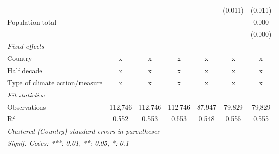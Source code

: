\begin{tabular}{lcccccc}
                                                                              &               &                &                &                & (0.011)        & (0.011)\\   
   Population total                                                           &               &                &                &                &                & 0.000\\   
                                                                              &               &                &                &                &                & (0.000)\\   
   \emph{Fixed effects}\\
   Country                                                                    & x             & x              & x              & x              & x              & x\\  
   Half decade                                                                & x             & x              & x              & x              & x              & x\\  
   Type of climate action/measure                                             & x             & x              & x              & x              & x              & x\\  
   \midrule \emph{Fit statistics}\\
   Observations                                                               & 112,746       & 112,746        & 112,746        & 87,947         & 79,829         & 79,829\\  
   R$^2$                                                                      & 0.552         & 0.553          & 0.553          & 0.548          & 0.555          & 0.555\\  
   \midrule
   \multicolumn{7}{l}{\emph{Clustered (Country) standard-errors in parentheses}}\\
   \multicolumn{7}{l}{\emph{Signif. Codes: ***: 0.01, **: 0.05, *: 0.1}}\\
\end{tabular}
\par\endgroup


